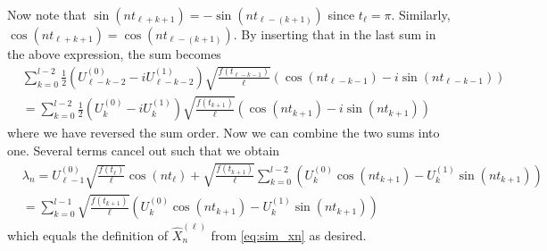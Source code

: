 \documentclass{article}
\begin{document}
Now note that $\sin\left(n t_{\ell+k+1}\right) = -\sin(nt_{\ell-(k+1)})$ since $t_\ell = \pi$. Similarly, $\cos\left(n t_{\ell+k+1}\right) = \cos(nt_{\ell-(k+1)})$. By inserting that in the last sum in the above expression, the sum becomes
\begin{align*}
&\sum_{k=0}^{l-2}\frac{1}{2} \left( U^{(0)}_{\ell-k-2}- i U^{(1)}_{\ell-k-2} \right) \sqrt{\frac{f(t_{\ell-k-1})}{\ell}} \left( \cos\left(n t_{\ell-k-1}\right) - i\sin\left(n t_{\ell-k-1}\right)\right)\\
& =\sum_{k=0}^{l-2}\frac{1}{2} \left( U^{(0)}_{k}- i U^{(1)}_{k} \right) \sqrt{\frac{f(t_{k+1})}{\ell}} \left( \cos\left(n t_{k+1}\right) - i\sin\left(n t_{k+1}\right)\right)
\end{align*}
where we have reversed the sum order. Now we can combine the two sums into one. Several terms cancel out such that we obtain
\begin{align*}
&\lambda_n = U^{(0)}_{\ell-1} \sqrt{\frac{f(t_\ell)}{\ell}}\cos(nt_\ell)+ \sqrt{\frac{f(t_{k+1})}{\ell}} \sum_{k=0}^{l-2} \left(U^{(0)}_k\cos\left(n t_{k+1}\right)-U^{(1)}_{k}\sin\left(n t_{k+1}\right)\right)\\
& = \sum_{k=0}^{l-1}\sqrt{\frac{f(t_{k+1})}{\ell}}\left(U^{(0)}_k\cos\left(n t_{k+1}\right)-U^{(1)}_{k}\sin\left(n t_{k+1}\right)\right)
\end{align*}
which equals the definition of $\hat{X}_n^{(\ell)}$ from \eqref{eq:sim_xn} as desired.

\newpage
{}


\end{document}
